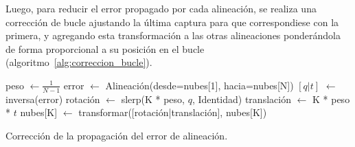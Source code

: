 	Luego, para reducir el error propagado por cada alineación, se realiza una
	corrección de bucle ajustando la última captura para que correspondiese con la primera,
	y agregando esta transformación a las otras alineaciones ponderándola de forma
	proporcional a su posición en el bucle (algoritmo~\ref{alg:correccion_bucle}).

	\begin{algorithm}
		\begin{algorithmic}[1]
				\State peso $\gets \frac{1}{N-1}$
				\State error $\gets$ Alineación(desde=nubes[1], hacia=nubes[N])
				\State $[q|t]$ $\gets$ inversa(error)
					\State rotación $\gets$ slerp(K * peso, $q$, Identidad)
					\State translación $\gets$ K * peso * $t$
					\State nubes[K] $\gets$ transformar([rotación|translación], nubes[K])
				\EndFor
			\EndFunction
		\end{algorithmic}
		\caption{\label{alg:correccion_bucle}Corrección de la propagación del error de alineación.}
	\end{algorithm}
